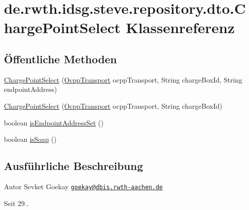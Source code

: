\hypertarget{classde_1_1rwth_1_1idsg_1_1steve_1_1repository_1_1dto_1_1_charge_point_select}{\section{de.\-rwth.\-idsg.\-steve.\-repository.\-dto.\-Charge\-Point\-Select Klassenreferenz}
\label{classde_1_1rwth_1_1idsg_1_1steve_1_1repository_1_1dto_1_1_charge_point_select}
}
\subsection*{Öffentliche Methoden}
\begin{DoxyCompactItemize}
\item 
\hyperlink{classde_1_1rwth_1_1idsg_1_1steve_1_1repository_1_1dto_1_1_charge_point_select_ad0cd7a65025caef02b43214960843816}{Charge\-Point\-Select} (\hyperlink{enumde_1_1rwth_1_1idsg_1_1steve_1_1ocpp_1_1_ocpp_transport}{Ocpp\-Transport} ocpp\-Transport, String charge\-Box\-Id, String endpoint\-Address)
\item 
\hyperlink{classde_1_1rwth_1_1idsg_1_1steve_1_1repository_1_1dto_1_1_charge_point_select_abe86c8f5d1ddc2910eed1201610a5fba}{Charge\-Point\-Select} (\hyperlink{enumde_1_1rwth_1_1idsg_1_1steve_1_1ocpp_1_1_ocpp_transport}{Ocpp\-Transport} ocpp\-Transport, String charge\-Box\-Id)
\item 
boolean \hyperlink{classde_1_1rwth_1_1idsg_1_1steve_1_1repository_1_1dto_1_1_charge_point_select_a1f7d0b13e760bed75b203af2b41b0b22}{is\-Endpoint\-Address\-Set} ()
\item 
boolean \hyperlink{classde_1_1rwth_1_1idsg_1_1steve_1_1repository_1_1dto_1_1_charge_point_select_abc2c6a1b288106f9a82dd089df66b6f7}{is\-Soap} ()
\end{DoxyCompactItemize}


\subsection{Ausführliche Beschreibung}
\begin{DoxyAuthor}{Autor}
Sevket Goekay \href{mailto:goekay@dbis.rwth-aachen.de}{\tt goekay@dbis.\-rwth-\/aachen.\-de} 
\end{DoxyAuthor}
\begin{DoxySince}{Seit}
29.. 
\end{DoxySince}


